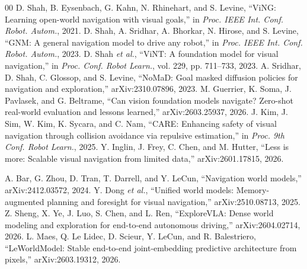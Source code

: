 \documentclass[conference]{IEEEtran}
\begin{document}
\begin{thebibliography}{00}
 D. Shah, B. Eysenbach, G. Kahn, N. Rhinehart, and S. Levine, \textquotedblleft ViNG: Learning open-world navigation with visual goals,\textquotedblright{} in \emph{Proc. IEEE Int. Conf. Robot. Autom.}, 2021.
 D. Shah, A. Sridhar, A. Bhorkar, N. Hirose, and S. Levine, \textquotedblleft GNM: A general navigation model to drive any robot,\textquotedblright{} in \emph{Proc. IEEE Int. Conf. Robot. Autom.}, 2023.
 D. Shah \emph{et al.}, \textquotedblleft ViNT: A foundation model for visual navigation,\textquotedblright{} in \emph{Proc. Conf. Robot Learn.}, vol. 229, pp. 711--733, 2023.
 A. Sridhar, D. Shah, C. Glossop, and S. Levine, \textquotedblleft NoMaD: Goal masked diffusion policies for navigation and exploration,\textquotedblright{} arXiv:2310.07896, 2023.
 M. Guerrier, K. Soma, J. Pavlasek, and G. Beltrame, \textquotedblleft Can vision foundation models navigate? Zero-shot real-world evaluation and lessons learned,\textquotedblright{} arXiv:2603.25937, 2026.
 J. Kim, J. Sim, W. Kim, K. Sycara, and C. Nam, \textquotedblleft CARE: Enhancing safety of visual navigation through collision avoidance via repulsive estimation,\textquotedblright{} in \emph{Proc. 9th Conf. Robot Learn.}, 2025.
 Y. Inglin, J. Frey, C. Chen, and M. Hutter, \textquotedblleft Less is more: Scalable visual navigation from limited data,\textquotedblright{} arXiv:2601.17815, 2026.

 A. Bar, G. Zhou, D. Tran, T. Darrell, and Y. LeCun, \textquotedblleft Navigation world models,\textquotedblright{} arXiv:2412.03572, 2024.
 Y. Dong \emph{et al.}, \textquotedblleft Unified world models: Memory-augmented planning and foresight for visual navigation,\textquotedblright{} arXiv:2510.08713, 2025.
 Z. Sheng, X. Ye, J. Luo, S. Chen, and L. Ren, \textquotedblleft ExploreVLA: Dense world modeling and exploration for end-to-end autonomous driving,\textquotedblright{} arXiv:2604.02714, 2026.
 L. Maes, Q. Le Lidec, D. Scieur, Y. LeCun, and R. Balestriero, \textquotedblleft LeWorldModel: Stable end-to-end joint-embedding predictive architecture from pixels,\textquotedblright{} arXiv:2603.19312, 2026.
\end{thebibliography}
\end{document}
